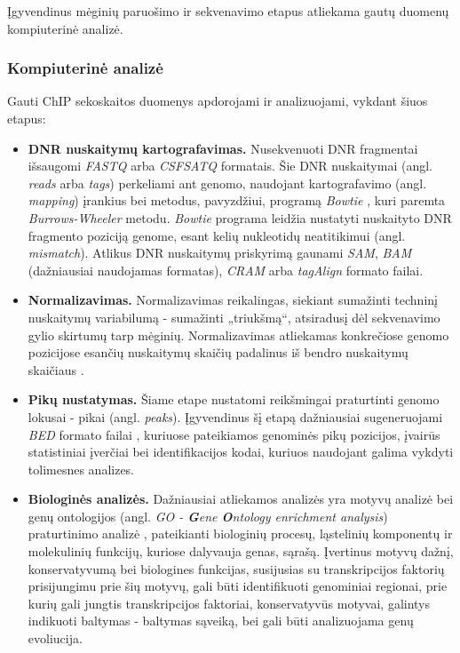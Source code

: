 \documentclass[12pt]{article}
\begin{document}
Įgyvendinus mėginių paruošimo ir sekvenavimo etapus atliekama gautų duomenų
kompiuterinė analizė.

\subsubsection{Kompiuterinė analizė}
Gauti ChIP sekoskaitos duomenys apdorojami ir analizuojami, vykdant šiuos
etapus:

\begin{itemize}
    \item \textbf{DNR nuskaitymų kartografavimas.} Nusekvenuoti DNR 
        fragmentai išsaugomi \emph{FASTQ} arba \emph{CSFSATQ} formatais. Šie DNR
        nuskaitymai (angl. \emph{reads} arba \emph{tags}) perkeliami ant genomo,
        naudojant kartografavimo (angl. \emph{mapping}) įrankius bei metodus,
        pavyzdžiui, programą \emph{Bowtie} \cite{ARTICLE6}, kuri paremta
        \emph{Burrows-Wheeler} metodu. \emph{Bowtie} programa leidžia nustatyti
        nuskaityto DNR fragmento poziciją genome,
        esant kelių nukleotidų neatitikimui \cite{ARTICLE7}
        (angl. \emph{mismatch}). Atlikus DNR nuskaitymų priskyrimą gaunami
        \emph{SAM}, \emph{BAM} (dažniausiai naudojamas formatas), \emph{CRAM}
        arba \emph{tagAlign} formato failai.
    \item \textbf{Normalizavimas.} Normalizavimas reikalingas, siekiant
        sumažinti techninį nuskaitymų variabilumą - sumažinti „triukšmą“,
        atsiradusį dėl sekvenavimo gylio skirtumų tarp mėginių. Normalizavimas
        atliekamas konkrečiose genomo pozicijose esančių nuskaitymų skaičių
        padalinus iš bendro nuskaitymų skaičiaus \cite{ARTICLE17}.
    \item \textbf{Pikų nustatymas.} Šiame etape
        nustatomi reikšmingai praturtinti genomo lokusai - pikai
        (angl. \emph{peaks}). Įgyvendinus šį etapą dažniausiai sugeneruojami
        \emph{BED} formato failai \cite{ARTICLE1}, kuriuose pateikiamos genominės
        pikų pozicijos, įvairūs statistiniai įverčiai bei identifikacijos kodai,
        kuriuos naudojant galima vykdyti tolimesnes analizes.
    \item \textbf{Biologinės analizės.} Dažniausiai atliekamos analizės yra
        motyvų analizė bei genų ontologijos
        (angl. \emph{GO - \textbf{G}ene \textbf{O}ntology enrichment analysis})
        praturtinimo analizė \cite{ARTICLE1},
        pateikianti biologinių procesų, ląstelinių komponentų ir molekulinių
        funkcijų, kuriose dalyvauja genas, sąrašą. Įvertinus motyvų dažnį,
        konservatyvumą bei biologines funkcijas, susijusias su transkripcijos
        faktorių prisijungimu prie šių motyvų, gali būti identifikuoti
        genominiai regionai, prie kurių gali jungtis transkripcijos faktoriai,
        konservatyvūs motyvai, galintys indikuoti baltymas - baltymas sąveiką,
        bei gali būti analizuojama genų evoliucija.
\end{itemize}
\end{document}

